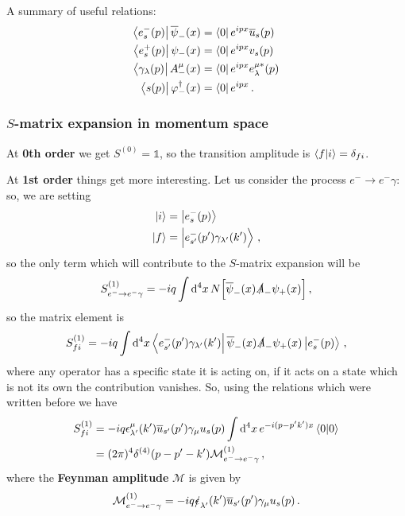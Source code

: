 \documentclass[main.tex]{subfiles}
\begin{document}
A summary of useful relations: 
%
\begin{align}
\bra{e^{-}_{s} (p)} \overline{\psi}_{-} (x) &= \bra{0} e^{ipx} \overline{u}_{s} (p) \\
\bra{e^{+}_{s} (p)} \psi_{-} (x) &= \bra{0} e^{ipx} v_{s} (p) \\
\bra{\gamma_{\lambda } (p)} A^{\mu }_{-} (x) &= \bra{0} e^{ipx} e^{\mu *}_{\lambda }(p) \\
\bra{s(p)} \varphi ^\dag_{-} (x) &= \bra{0} e^{ipx} 
\,.
\end{align}

\subsubsection{\(S\)-matrix expansion in momentum space}

At \textbf{0th order} we get \(S^{(0)} = \mathbb{1}\), so the transition amplitude is \(\braket{f}{i}= \delta_{fi} \). 

At \textbf{1st order} things get more interesting. Let us consider the process \(e^{-} \to e^{-} \gamma \): so, we are setting 
%
\begin{align}
\ket{i} &= \ket{e^{-}_{s}(p)}  \\
\ket{f} &= \ket{e^{-}_{s'} (p') \gamma_{\lambda'} (k')}
\,,
\end{align}
%
so the only term which will contribute to the \(S\)-matrix expansion will be 
%
\begin{align}
S^{(1)}_{e^{-} \to e^{-}\gamma } 
= -iq \int \dd[4]{x} N \qty[ \overline{\psi}_{-} (x) \slashed{A}_{-} \psi_{+} (x)]
\,,
\end{align}
%
so the matrix element is 
%
\begin{align}
S^{(1)}_{fi} = -iq \int \dd[4]{x} \bra{e^{-}_{s'} (p') \gamma_{\lambda'} (k')} \overline{\psi}_{-} (x) \slashed{A}_{-} \psi_{+} (x) \ket{e^{-}_{s}(p)}
\,,
\end{align}
%
where any operator has a specific state it is acting on, if it acts on a state which is not its own the contribution vanishes. 
So, using the relations which were written before we have 
%
\begin{align}
S^{(1)}_{fi} &= -iq \epsilon^{\mu }_{\lambda' } (k') \overline{u}_{s'} (p') \gamma_{\mu } u_s (p) \int \dd[4]{x} e^{-i(p - p' k')x} \braket{0}{0}  \\
&= (2 \pi )^{4} \delta^{(4)} (p - p' - k') \mathcal{M}^{(1)}_{e^{-} \to e^{-}\gamma }
\,,
\end{align}
%
where the \textbf{Feynman amplitude} \(\mathcal{M}\) is given by 
%
\begin{align}
\mathcal{M}^{(1)}_{e^{-} \to e^{-}\gamma } =   
-iq \slashed{\epsilon}_{\lambda' } (k') \overline{u}_{s'} (p') \gamma_{\mu } u_s (p)
\,.
\end{align}
\end{document}
